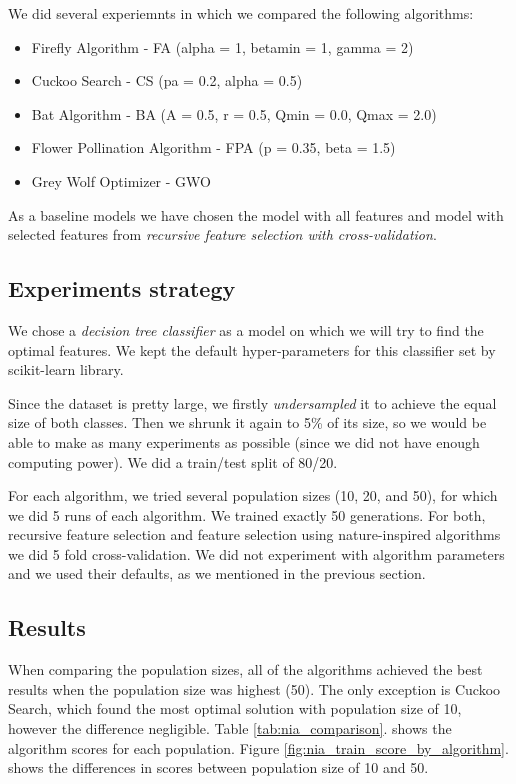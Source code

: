\documentclass[runningheads]{llncs}
\begin{document}
We did several experiemnts in which we compared the following algorithms:

\begin{itemize}
	\item Firefly Algorithm \cite{fister2013comprehensive} - FA (alpha = 1, betamin = 1, gamma = 2)
	\item Cuckoo Search \cite{yang2009cuckoo} - CS (pa = 0.2, alpha = 0.5)
	\item Bat Algorithm \cite{yang2010new} - BA (A = 0.5, r = 0.5, Qmin = 0.0, Qmax = 2.0)
	\item Flower Pollination Algorithm \cite{yang2012flower} - FPA (p = 0.35, beta = 1.5)
	\item Grey Wolf Optimizer \cite{Mirjalili_Mirjalili_Lewis_2014} - GWO
\end{itemize}

As a baseline models we have chosen the model with all features and model with selected features from \textit{recursive feature selection with cross-validation}.

\subsection{Experiments strategy}

We chose a \textit{decision tree classifier} as a model on which we will try to find the optimal features. We kept the default hyper-parameters for this classifier set by scikit-learn library.

Since the dataset is pretty large, we firstly \textit{undersampled} it to achieve the equal size of both classes. Then we shrunk it again to 5\% of its size, so we would be able to make as many experiments as possible (since we did not have enough computing power). We did a train/test split of 80/20.

For each algorithm, we tried several population sizes (10, 20, and 50), for which we did 5 runs of each algorithm. We trained exactly 50 generations. For both, recursive feature selection and feature selection using nature-inspired algorithms we did 5 fold cross-validation. We did not experiment with algorithm parameters and we used their defaults, as we mentioned in the previous section.

\subsection{Results}

When comparing the population sizes, all of the algorithms achieved the best results when the population size was highest (50). The only exception is Cuckoo Search, which found the most optimal solution with population size of 10, however the difference negligible. Table \ref{tab:nia_comparison}. shows the algorithm scores for each population. Figure \ref{fig:nia_train_score_by_algorithm}. shows the differences in scores between population size of 10 and 50.
\end{document}
